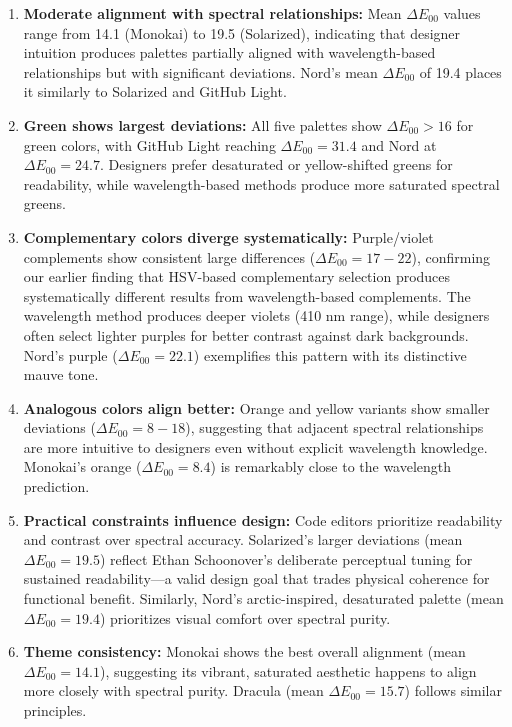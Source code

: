 \documentclass[12pt,a4paper]{article}
\newcommand{\deltaE}{\Delta E_{00}}
\begin{document}
\begin{enumerate}
\item \textbf{Moderate alignment with spectral relationships:} Mean $\deltaE$ values range from 14.1 (Monokai) to 19.5 (Solarized), indicating that designer intuition produces palettes partially aligned with wavelength-based relationships but with significant deviations. Nord's mean $\deltaE$ of 19.4 places it similarly to Solarized and GitHub Light.

\item \textbf{Green shows largest deviations:} All five palettes show $\deltaE > 16$ for green colors, with GitHub Light reaching $\deltaE = 31.4$ and Nord at $\deltaE = 24.7$. Designers prefer desaturated or yellow-shifted greens for readability, while wavelength-based methods produce more saturated spectral greens.

\item \textbf{Complementary colors diverge systematically:} Purple/violet complements show consistent large differences ($\deltaE = 17-22$), confirming our earlier finding that HSV-based complementary selection produces systematically different results from wavelength-based complements. The wavelength method produces deeper violets (410 nm range), while designers often select lighter purples for better contrast against dark backgrounds. Nord's purple ($\deltaE = 22.1$) exemplifies this pattern with its distinctive mauve tone.

\item \textbf{Analogous colors align better:} Orange and yellow variants show smaller deviations ($\deltaE = 8-18$), suggesting that adjacent spectral relationships are more intuitive to designers even without explicit wavelength knowledge. Monokai's orange ($\deltaE = 8.4$) is remarkably close to the wavelength prediction.

\item \textbf{Practical constraints influence design:} Code editors prioritize readability and contrast over spectral accuracy. Solarized's larger deviations (mean $\deltaE = 19.5$) reflect Ethan Schoonover's deliberate perceptual tuning for sustained readability—a valid design goal that trades physical coherence for functional benefit. Similarly, Nord's arctic-inspired, desaturated palette (mean $\deltaE = 19.4$) prioritizes visual comfort over spectral purity.

\item \textbf{Theme consistency:} Monokai shows the best overall alignment (mean $\deltaE = 14.1$), suggesting its vibrant, saturated aesthetic happens to align more closely with spectral purity. Dracula (mean $\deltaE = 15.7$) follows similar principles.
\end{enumerate}
\end{document}
